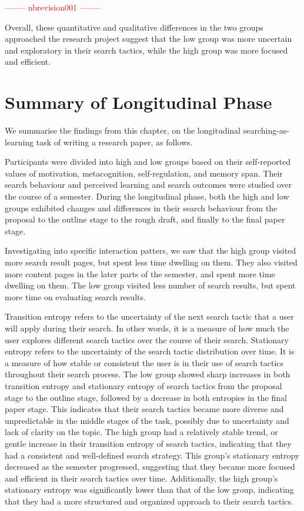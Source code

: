 \documentclass[letterpaper, nobind]{templates/ociamthesis}
\begin{document}
\textcolor{red}{-------- nbrevision001 --------}

Overall, these quantitative and qualitative differences in the two groups approached the research project suggest that the low group was more uncertain and exploratory in their search tactics, while the high group was more focused and efficient.

\hypertarget{summary-of-longitudinal-phase}{%
\section{Summary of Longitudinal Phase}\label{summary-of-longitudinal-phase}}

We summarise the findings from this chapter, on the longitudinal searching-as-learning task of writing a research paper, as follows.

Participants were divided into high and low groups based on their self-reported values of motivation, metacognition, self-regulation, and memory span.
Their search behaviour and perceived learning and search outcomes were studied over the course of a semester.
During the longitudinal phase, both the high and low groups exhibited changes and differences in their search behaviour from the proposal to the outline stage to the rough draft, and finally to the final paper stage.

Investigating into specific interaction patters, we saw that the high group visited more search result pages, but spent less time dwelling on them. They also visited more content pages in the later parts of the semester, and spent more time dwelling on them.
The low group visited less number of search results, but spent more time on evaluating search results.

Transition entropy refers to the uncertainty of the next search tactic that a user will apply during their search.
In other words, it is a measure of how much the user explores different search tactics over the course of their search.
Stationary entropy refers to the uncertainty of the search tactic distribution over time.
It is a measure of how stable or consistent the user is in their use of search tactics throughout their search process.
The low group showed sharp increases in both transition entropy and stationary entropy of search tactics from the proposal stage to the outline stage, followed by a decrease in both entropies in the final paper stage.
This indicates that their search tactics became more diverse and unpredictable in the middle stages of the task, possibly due to uncertainty and lack of clarity on the topic.
The high group had a relatively stable trend, or gentle increase in their transition entropy of search tactics, indicating that they had a consistent and well-defined search strategy.
This group's stationary entropy decreased as the semester progressed, suggesting that they became more focused and efficient in their search tactics over time.
Additionally, the high group's stationary entropy was significantly lower than that of the low group, indicating that they had a more structured and organized approach to their search tactics.
\end{document}
